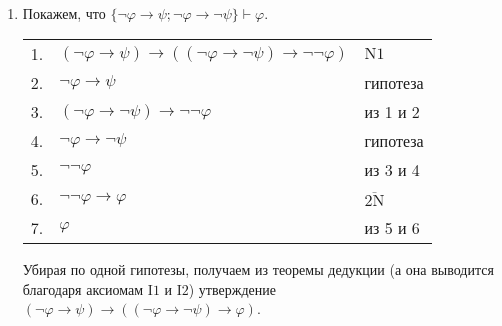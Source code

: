 \documentclass[12pt,a4paper]{article}
\begin{document}
    \begin{enumproblem}\ 
        \begin{enumerate}
            \item Покажем, что $\{\neg \varphi \rightarrow \psi; \neg \varphi \rightarrow \neg \psi\} \vdash \varphi$.
                \begin{center}
                    \begin{tabular}{rll}
                        1.& $(\neg \varphi \rightarrow \psi) \rightarrow ((\neg \varphi \rightarrow \neg \psi) \rightarrow \neg \neg \varphi)$& $\mathrm{N1}$\\
                        2.& $\neg \varphi \rightarrow \psi$& гипотеза\\
                        3.& $(\neg \varphi \rightarrow \neg \psi) \rightarrow \neg \neg \varphi$& из 1 и 2\\
                        4.& $\neg \varphi \rightarrow \neg \psi$& гипотеза\\
                        5.& $\neg \neg \varphi$& из 3 и 4\\
                        6.& $\neg \neg \varphi \rightarrow \varphi$& $\overline{\mathrm{2N}}$\\
                        7.& $\varphi$& из 5 и 6\\
                    \end{tabular}
                \end{center}
                Убирая по одной гипотезы, получаем из теоремы дедукции (а она выводится благодаря аксиомам $\mathrm{I1}$ и $\mathrm{I2}$) утверждение $(\neg \varphi \rightarrow \psi) \rightarrow ((\neg \varphi \rightarrow \neg \psi) \rightarrow \varphi)$.


\end{enumerate}
\end{enumproblem}
\end{document}
